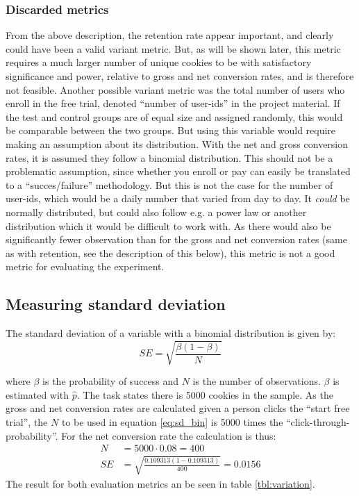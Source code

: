 \documentclass[12pt]{article}
\begin{document}
\subsubsection{Discarded metrics}
From the above description, the retention rate appear important, and clearly could have been a valid variant metric. But, as will be shown later, this metric requires a much larger number of unique cookies to be with satisfactory significance and power, relative to gross and net conversion rates, and is therefore not feasible.
\newline
Another possible variant metric was the total number of users who enroll in the free trial, denoted ``number of user-ids'' in the project material. If the test and control groups are of equal size and assigned randomly, this would be comparable between the two groups. But using this variable would require making an assumption about its distribution. With the net and gross conversion rates, it is assumed they follow a binomial distribution. This should not be a problematic assumption, since whether you enroll or pay can easily be translated to a ``succes/failure'' methodology.
But this is not the case for the number of user-ids, which would be a daily number that varied from day to day. It \textit{could} be normally distributed, but could also follow e.g. a power law or another distribution which it would be difficult to work with. As there would also be significantly fewer observation than for the gross and net conversion rates (same as with retention, see the description of this below), this metric is not a good metric for evaluating the experiment.

\subsection{Measuring standard deviation}
The standard deviation of a variable with a binomial distribution is given by:
\begin{equation}
SE = \sqrt{\frac{\beta \left(1-\beta \right)}{N}}	
\label{eq:sd_bin}
\end{equation}

where $\beta$ is the probability of success and $N$ is the number of observations. $\beta$ is estimated with $\hat{p}$. The task states there is 5000 cookies in the sample. As the gross and net conversion rates are calculated given a person clicks the ``start free trial'', the $N$ to be used in  equation \ref{eq:sd_bin} is 5000 times the ``click-through-probability''. For the net conversion rate the calculation is thus:
\begin{align}
N &= 5000 \cdot 0.08 = 400 \\
SE &= \sqrt{\frac{0.109313 \left(1-0.109313 \right)}{400}} = 0.0156	
\end{align}
The result for both evaluation metrics an be seen in table \ref{tbl:variation}.
\end{document}
